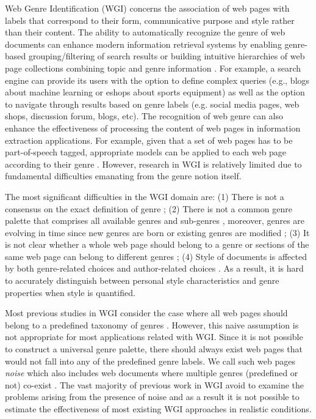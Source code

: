\documentclass[runningheads]{llncs}
\begin{document}
Web Genre Identification (WGI) concerns the association of web pages with labels that correspond to their form, communicative purpose and style rather than their content. The ability to automatically recognize the genre of web documents can enhance modern information retrieval systems by enabling genre-based grouping/filtering of search results or building intuitive hierarchies of web page collections combining topic and genre information \citep{Braslavski2007,Rosso2008,de2009genre}. For example, a search engine can provide its users with the option to define complex queries (e.g., blogs about machine learning or eshops about sports equipment) as well as the option to navigate through results based on genre labels (e.g. social media pages, web shops, discussion forum, blogs, etc). The recognition of web genre can also enhance the effectiveness of processing the content of web pages in information extraction applications. For example, given that a set of web pages has to be part-of-speech tagged, appropriate models can be applied to each web page according to their genre \citep{Nooralahzadeh2014}. However, research in WGI is relatively limited due to fundamental difficulties emanating from the genre notion itself.

The most significant difficulties in the WGI domain are: (1) There is not a consensus on the exact definition of genre \citep{crowston2011problems}; (2) There is not a common genre palette that comprises all available genres and sub-genres \citep{santini2011cross,mehler2010genres_on_web,mason2009n,sharoff2010web}, moreover, genres are evolving in time since new genres are born or existing genres are modified \citep{Boese2005}; (3) It is not clear whether a whole web page should belong to a genre or sections of the same web page can belong to different genres \citep{jebari2015combination,madjarov2015web}; (4) Style of documents is affected by both genre-related choices and author-related choices \citep{petrenz2011stable,Sharroff2010}. As a result, it is hard to accurately distinguish between personal style characteristics and genre properties when style is quantified.

Most previous studies in WGI consider the case where all web pages should belong to a predefined taxonomy of genres \citep{Lim2005,santini2007automatic,kanaris2009learning,jebari2014pure_URL}. However, this naive assumption is not appropriate for most applications related with WGI. Since it is not possible to construct a universal genre palette, there should always exist web pages that would not fall into any of the predefined genre labels. We call such web pages \textit{noise} which also includes web documents where multiple genres (predefined or not) co-exist \citep{santini2011cross,levering2008using}. The vast majority of previous work in WGI avoid to examine the problems arising from the presence of noise and as a result it is not possible to estimate the effectiveness of most existing WGI approaches in realistic conditions.
\end{document}
